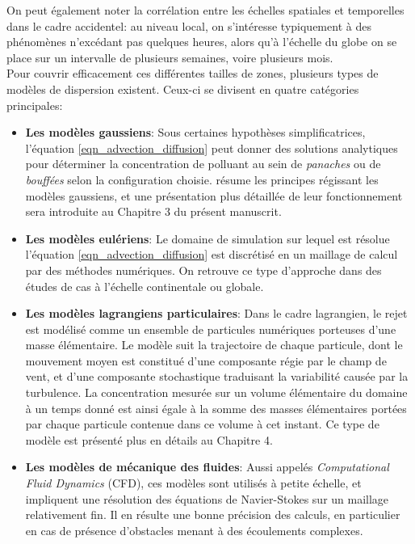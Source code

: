 	On peut également noter la corrélation entre les échelles spatiales et temporelles dans le cadre accidentel: au niveau local, on s'intéresse typiquement à des phénomènes n'excédant pas quelques heures, alors qu'à l'échelle du globe on se place sur un intervalle de plusieurs semaines, voire plusieurs mois.\\ 
	
	Pour couvrir efficacement ces différentes tailles de zones, plusieurs types de modèles de dispersion existent. Ceux-ci se divisent en quatre catégories principales:\\
	
	\begin{itemize} 
		
	\item \textbf{Les modèles gaussiens}:
	Sous certaines hypothèses simplificatrices, l'équation \eqref{eqn_advection_diffusion} peut donner des solutions analytiques pour déterminer la concentration de polluant au sein de \textit{panaches} ou de \textit{bouffées} selon la configuration choisie. \cite{Stockie2011} résume les principes régissant les modèles gaussiens, et une présentation plus détaillée de leur fonctionnement sera introduite au Chapitre 3 du présent manuscrit.\\
	
	\item \textbf{Les modèles eulériens}:
	Le domaine de simulation sur lequel est résolue l'équation \eqref{eqn_advection_diffusion} est discrétisé en un maillage de calcul  par des méthodes numériques. On retrouve ce type d'approche dans des études de cas à l'échelle continentale \cite{Saunier2013} ou globale. \\
	
	\item \textbf{Les modèles lagrangiens particulaires}:
	Dans le cadre lagrangien, le rejet est modélisé comme un ensemble de particules numériques porteuses d'une masse élémentaire. Le modèle suit la trajectoire de chaque particule, dont le mouvement moyen est constitué d'une composante régie par le champ de vent, et d'une composante stochastique traduisant la variabilité causée par la turbulence. La concentration mesurée sur un volume élémentaire du domaine à un temps donné est ainsi égale à la somme des masses élémentaires portées par chaque particule contenue dans ce volume à cet instant. Ce type de modèle est présenté plus en détails au Chapitre 4.\\
	
	\item \textbf{Les modèles de mécanique des fluides}:
	Aussi appelés \textit{Computational Fluid Dynamics} (CFD), ces modèles sont utilisés à petite échelle, et impliquent une résolution des équations de Navier-Stokes sur un maillage relativement fin. Il en résulte une bonne précision des calculs, en particulier en cas de présence d'obstacles menant à des écoulements complexes.\\
	
	\end{itemize}
	

